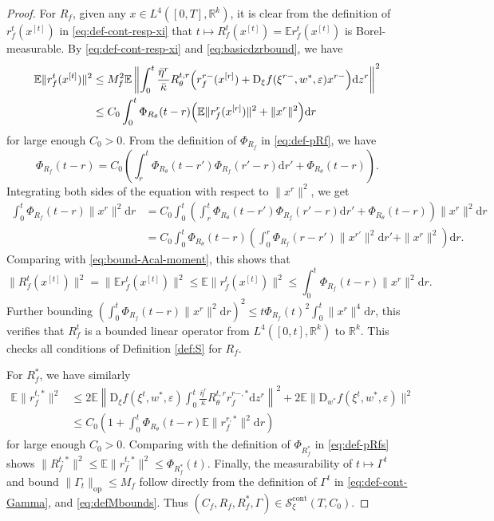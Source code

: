 \documentclass[11pt,letterpaper,reqno]{amsart}
\theoremstyle{definition}
\def\eps{\varepsilon}
\def\d{\mathrm{d}}
\def\D{\mathrm{D}}
\def\E{\mathbb{E}}
\def\R{\mathbb{R}}
\def\op{\mathrm{op}}
\def\cS{\mathcal{S}}
\def\Rt{R_\theta}
\def\Rf{R_f}
\def\pRt{\Phi_{\Rt}}
\def\pRf{\Phi_{\Rf}}
\def\pRfs{\Phi_{\Rf^*}}
\newcommand{\norm}[1]{\|#1\|}
\newcommand{\prn}[1]{\left({#1}\right)} %
\begin{document}
\begin{proof}
For $R_f$, given any $x \in L^4([0,T],\R^k)$, 
it is clear from the definition of $r_f^t(x^{[t]})$
in \eqref{eq:def-cont-resp-xi} that
$t \mapsto R_f^t(x^{[t]})=\E r_f^t(x^{[t]})$ is Borel-measurable.
By \eqref{eq:def-cont-resp-xi} and \eqref{eq:basicdzrbound},
we have
\begin{align}
\E\|r_f^t(x^{[t]})\|^2 &\leq M_f^2
\E\left\|\int_0^t \frac{\bar\eta^r}{\bar\kappa}
R_\theta^{t,r}\Big(r_f^{r-}(x^{[r]})+\D_\xi f(\xi^{r-},w^*,\eps)x^{r-}\Big)\d
z^r\right\|^2\notag\\
&\leq C_0\int_0^t \Phi_{R_\theta}(t-r)
\Big(\E \|r_f^r(x^{[r]})\|^2+\|x^r\|^2\Big)\d r\label{eq:bound-Acal-moment}
\end{align}
for large enough $C_0>0$. From the definition of $\pRf$ in \eqref{eq:def-pRf}, we have
\begin{equation}\label{eq:def-pRf-lem}
\pRf(t-r)=C_0\left(\int_r^t \pRt(t-r')\pRf(r'-r)\d r'
+\Phi_{R_\theta}(t-r)\right).
\end{equation}
Integrating both sides of the equation with respect to ${\norm{x^r}^2}$, we get
\begin{align*}
\int_0^t \pRf(t-r) \norm{x^r}^2\d r
&=C_0\int_0^t \prn{\int_r^t \pRt(t-r') \pRf(r'-r) \d r' + \pRt(t-r)} \norm{x^r}^2\d r\nonumber\\
    &=C_0\int_0^t \pRt(t-r)\prn{\int_0^r \pRf(r-r')\norm{x^{r'}}^2\d {r'}+
\norm{x^r}^2}\d r.
\end{align*}
Comparing with \eqref{eq:bound-Acal-moment}, this shows that
\begin{equation}\label{eq:Erfsquaredbound}
\|R_f^t(x^{[t]})\|^2
=\|\E r_f^{t}(x^{[t]})\|^2
\leq \E\norm{r_f^{t}(x^{[t]})}^2 \leq \int_0^t \pRf(t-r) \norm{x^r}^2\d r.
\end{equation}
Further bounding
$(\int_0^t \pRf(t-r) \norm{x^r}^2\d r)^2
\leq t\pRf(t)^2\int_0^t \norm{x^r}^4\d r$, this verifies that
$R_f^t$ is a bounded linear operator from $L^4([0,t],\R^k)$ to $\R^k$. This
checks all conditions of Definition \ref{def:S} for $R_f$.

For $R_f^*$, we have similarly
\begin{align*}
    \E \norm{r_f^{t,*}}^2
&\leq 2\E\left\|\D_\xi f(\xi^t,w^*,\eps) \int_0^t
\frac{\bar\eta^r}{\bar\kappa}
\Rt^{t,r}r_f^{r-,*}\d z^r\right\|^2
+2\E\|\D_{w^*} f(\xi^t,w^*,\eps)\|^2\\
&\leq C_0\left(1+\int_0^t \pRt(t-r)\E\|r_f^{r,*}\|^2\d r\right)
\end{align*}
for large enough $C_0>0$. Comparing with the definition of $\Phi_{R_f^*}$ in
\eqref{eq:def-pRfs} shows
$\|R_f^{t,*}\|^2 \leq \E\|r_f^{t,*}\|^2 \leq \pRfs(t)$. Finally, 
the measurability of $t \mapsto \Gamma^t$ and bound
$\|\Gamma_t\|_\op \leq M_f$ follow directly from the definition of $\Gamma^t$ 
in \eqref{eq:def-cont-Gamma}, and \eqref{eq:defMbounds}.
Thus $(C_f,R_f,R_f^*,\Gamma) \in \cS_\xi^{\mathrm{cont}}(T,C_0)$.
\end{proof}
\end{document}
